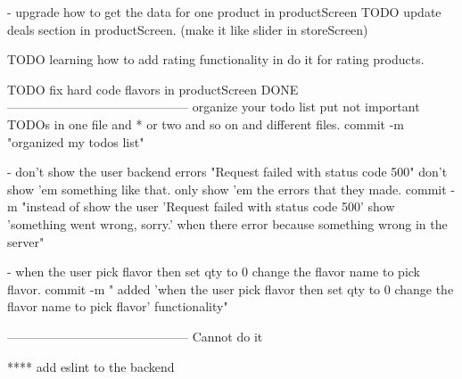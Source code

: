 - upgrade how to get the data for one product in productScreen
TODO update deals section in productScreen. (make it like slider in storeScreen)

TODO learning how to add rating functionality in do it for rating products.

TODO fix hard code flavors in productScreen
DONE
--------------------------------------------
organize your todo list put not important TODOs in one file and * or two and so on and different files.
    commit -m "organized my todos list"

- don't show the user backend errors "Request failed with 
    status code 500" don't show 'em something like that. only 
    show 'em the errors that they made.
    commit -m "instead of show the user 'Request failed with status code 500' show 'something went wrong, sorry.' when there error because something wrong in the server"

- when the user pick flavor then set qty to 0 change the flavor name to pick flavor.
    commit -m " added 'when the user pick flavor then set qty to 0 change the flavor name to pick flavor' functionality"

--------------------------------------------
Cannot do it

**** add eslint to the backend
